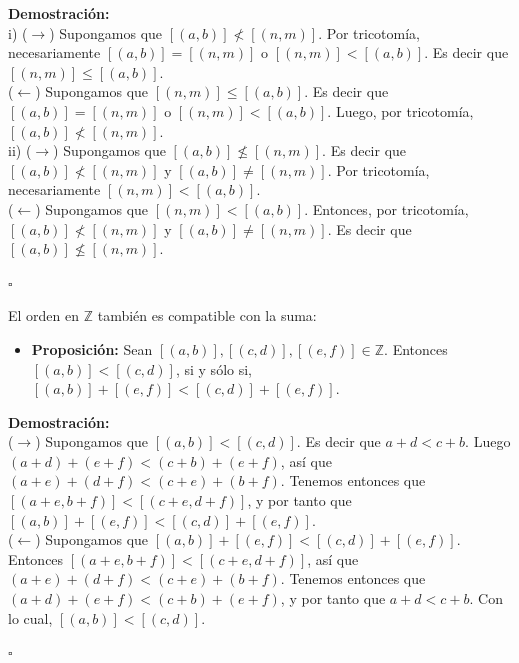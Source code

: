 \documentclass[10 pt]{article}
\begin{document}
\Large{\textbf{Demostración:} \\

i) ($\rightarrow$) Supongamos que $[(a,b)] \nless [(n,m)]$. Por tricotomía, necesariamente $[(a,b)]=[(n,m)]$ o $[(n,m)]<[(a,b)]$. Es decir que $[(n,m)] \leq [(a,b)]$. \\

($\leftarrow$) Supongamos que $[(n,m)] \leq [(a,b)]$. Es decir que $[(a,b)]=[(n,m)]$ o $[(n,m)]<[(a,b)]$. Luego, por tricotomía, $[(a,b)] \nless [(n,m)]$. \\

ii) ($\rightarrow$) Supongamos que $[(a,b)] \nleq [(n,m)]$. Es decir que $[(a,b)] \nless [(n,m)]$ y $[(a,b)] \neq [(n,m)]$. Por tricotomía, necesariamente $[(n,m)]<[(a,b)]$. \\

($\leftarrow$) Supongamos que $[(n,m)]<[(a,b)]$. Entonces, por tricotomía, $[(a,b)] \nless [(n,m)]$ y $[(a,b)] \neq [(n,m)]$. Es decir que $[(a,b)] \nleq [(n,m)]$.} \\

\begin{flushright}
    $\square$
\end{flushright}

\Large{El orden en $\mathbb Z$ también es compatible con la suma:} \\

\begin{itemize}
    \item \Large{\textbf{Proposición:} Sean $[(a,b)],[(c,d)],[(e,f)] \in \mathbb Z$. Entonces $[(a,b)]<[(c,d)]$, si y sólo si, $[(a,b)]+[(e,f)]<[(c,d)]+[(e,f)]$.} \\
\end{itemize}

\Large{\textbf{Demostración:} \\

($\rightarrow$) Supongamos que $[(a,b)]<[(c,d)]$. Es decir que $a+d<c+b$. Luego $(a+d)+(e+f)<(c+b)+(e+f)$, así que $(a+e)+(d+f)<(c+e)+(b+f)$. Tenemos entonces que $[(a+e,b+f)]<[(c+e,d+f)]$, y por tanto que $[(a,b)]+[(e,f)]<[(c,d)]+[(e,f)]$. \\

($\leftarrow$) Supongamos que $[(a,b)]+[(e,f)]<[(c,d)]+[(e,f)]$. Entonces $[(a+e,b+f)]<[(c+e,d+f)]$, así que $(a+e)+(d+f)<(c+e)+(b+f)$. Tenemos entonces que $(a+d)+(e+f)<(c+b)+(e+f)$, y por tanto que $a+d<c+b$. Con lo cual, $[(a,b)]<[(c,d)]$.} \\

\begin{flushright}
    $\square$
\end{flushright}
\end{document}

